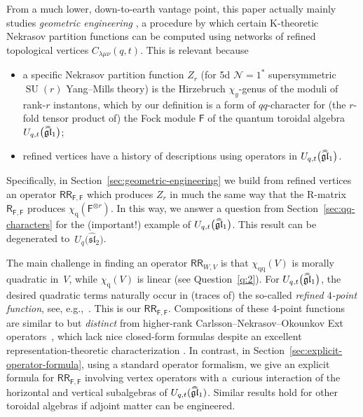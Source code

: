 \documentclass[10pt,a4paper]{amsart}
\numberwithin{equation}{section}
\renewcommand{\hat}[1]{\widehat{#1}}
\newcommand{\hhat}[1]{\hat{\vphantom{\rule{1pt}{5.5pt}}\smash{\hat{#1}}}}
\newcommand{\lie}[1]{\mathfrak{#1}}
\newcommand{\cN}{\mathcal{N}}
\newcommand{\sF}{\mathsf{F}}
\newcommand{\sR}{\mathsf{R}}
\newcommand{\sRR}{\mathsf{RR}}
\newcommand{\chiq}{\chi_{\mathrm{q}}}
\newcommand{\chiqq}{\chi_{\mathrm{qq}}}
\DeclareMathOperator{\SU}{SU}
\begin{document}
From a much lower, down-to-earth vantage point, this paper actually
mainly studies {\it geometric engineering} \cite{Iqbal2006, Katz1997},
a procedure by which certain K-theoretic Nekrasov partition functions
can be computed using networks of refined topological vertices
$C_{\lambda\mu\nu}(q,t)$. This is relevant because
\begin{itemize}\itemsep=0pt
\item a specific Nekrasov partition function $Z_r$ (for 5d $\cN=1^*$
 supersymmetric $\SU(r)$ Yang--Mills theory) is the Hirzebruch
 $\chi_y$-genus of the moduli of rank-$r$ instantons, which by our
 definition is a form of $qq$-character for (the $r$-fold tensor
 product of) the Fock module $\sF$ of the quantum toroidal algebra
 $U_{q,t}\big(\hhat{\lie{gl}}_1\big)$;
\item refined vertices have a history of descriptions \cite{Awata2012,
 Iqbal2010} using operators in $U_{q,t}\big(\hhat{\lie{gl}}_1\big)$.
\end{itemize}
Specifically, in Section~\ref{sec:geometric-engineering} we build from
refined vertices an operator $\sRR_{\sF,\sF}$ which produces $Z_r$ in
much the same way that the R-matrix $\sR_{\sF,\sF}$ produces
$\chiq(\sF^{\otimes r})$. In this way, we answer a question from
Section~\ref{sec:qq-characters} for the (important!) example of
$U_{q,t}\big(\hhat{\lie{gl}}_1\big)$. This result can be degenerated to~$U_q\big(\hat{\lie{sl}}_2\big)$.

The main challenge in finding an operator $\sRR_{W,V}$ is that
$\chiqq(V)$ is morally quadratic in~$V$, while $\chiq(V)$ is linear
(see Question~\ref{q:2}). For $U_{q,t}\big(\hhat{\lie{gl}}_1\big)$, the
desired quadratic terms naturally occur in (traces of) the so-called
{\it refined $4$-point function}, see, e.g.,~\cite{Awata2016}. This is our
$\sRR_{\sF,\sF}$. Compositions of these 4-point functions are similar
to but {\it distinct} from higher-rank Carlsson--Nekrasov--Okounkov
Ext operators~\cite{Carlsson2014}, which lack nice closed-form
formulas despite an excellent representation-theoretic
characterization \cite{Negut2017,Negut2020}. In contrast, in
Section~\ref{sec:explicit-operator-formula}, using a standard operator
formalism, we give an explicit formula for $\sRR_{\sF,\sF}$ involving
vertex operators with a~curious interaction of the horizontal and
vertical subalgebras of $U_{q,t}(\hhat{\lie{gl}}_1)$. Similar results
hold for other toroidal algebras if adjoint matter can be engineered.
\end{document}
